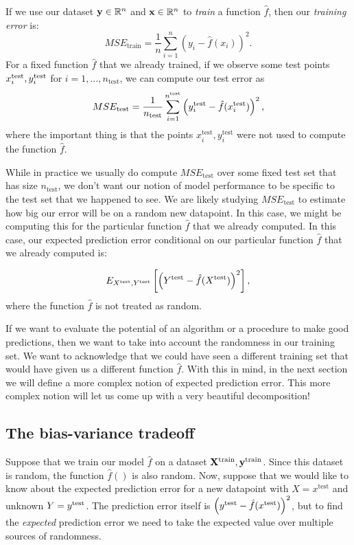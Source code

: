 If we use our dataset $\bold{y} \in \mathbb{R}^n$ and $\bold{x} \in \mathbb{R}^n$ to \emph{train} a function $\hat{f}$, then our \emph{training error} is:
$$
MSE_\mathrm{train} =  \frac{1}{n} \sum_{i=1}^n \left( y_i - \hat{f}(x_i)\right)^2. 
$$
For a fixed function $\hat{f}$ that we already trained, if we observe some test points $x^{\mathrm{test}}_i, y^{\mathrm{test}}_i$ for $i=1,\ldots, n_\mathrm{test}$, we can compute our test error as 
$$
MSE_\mathrm{test} =  \frac{1}{n_\mathrm{test}} \sum_{i=1}^{n^{\mathrm{test}}} \left( y^{\mathrm{test}}_i - \hat{f}(x^{\mathrm{test}}_i)\right)^2, 
$$
where the important thing is that the points $x_i^\mathrm{test}, y_i^{\mathrm{test}}$ were not used to compute the function $\hat{f}$. 

While in practice we usually do compute $MSE_\mathrm{test}$ over some fixed test set that has size $n_\mathrm{test}$, we don't want our notion of model performance to be specific to the test set that we happened to see. We are likely studying $MSE_\mathrm{test}$ to estimate how big our error will be on a random new datapoint. In this case, we might be computing this for the particular function  $\hat{f}$ that we already computed. In this case, our expected prediction error conditional on our particular function $\hat{f}$ that we already computed is: 

$$
E_{X^{\mathrm{test}}, Y^{\mathrm{test}}}\left[ \left( Y^{\mathrm{test}} - \hat{f}(X^{\mathrm{test}})\right)^2 \right],
$$
where the function $\hat{f}$ is not treated as random.

If we want to evaluate the potential of an algorithm or a procedure to make good predictions, then we want to take into account the randomness in our training set. We want to acknowledge that we could have seen a different training set that would have given us a different function $\hat{f}$. With this in mind, in the next section we will define a more complex notion of expected prediction error. This more complex notion will let us come up with a very beautiful decomposition!

\subsection{The bias-variance tradeoff}

Suppose that we train our model $\hat{f}$ on a dataset $\bold{X}^\mathrm{train}, \bold{y}^\mathrm{train}$. Since this dataset is random, the function $\hat{f}()$ is also random. Now, suppose that we would like to know about the expected prediction error for a new datapoint with $X=x^\mathrm{test}$ and unknown $Y=y^{\mathrm{test}}$. The prediction error itself is 
$
\left(y^{\mathrm{test}} - \hat{f}(x^{\mathrm{test}})\right)^2
$, but to find the \emph{expected} prediction error we need to take the expected value over multiple sources of randomness. 

